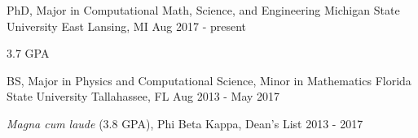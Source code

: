 

\begin{cventries}

  \cventry
    {PhD, Major in Computational Math, Science, and Engineering} %
    {Michigan State University} %
    {East Lansing, MI} %
    {Aug 2017 - present} %
    {
      \begin{cvitems} %
        \item {3.7 GPA}
      \end{cvitems}
    }

  \cventry
  {BS, Major in Physics and Computational Science, Minor in Mathematics} %
  {Florida State University} %
  {Tallahassee, FL} %
  {Aug 2013 - May 2017} %
  {
    \begin{cvitems} %
      \item {\textit{Magna cum laude} (3.8 GPA), Phi Beta Kappa, Dean's List 2013 - 2017}
    \end{cvitems}
  }
\end{cventries}

